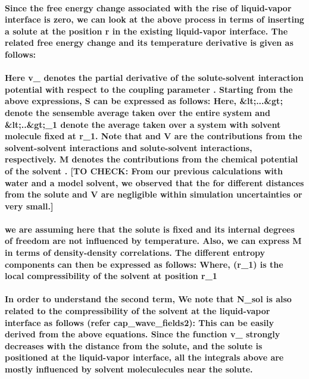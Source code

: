 \documentclass[a4paper,12pt,single,pdftex]{scrartcl}
\begin{document}
{\label{ID_1074911865}\paragraph{Since the free energy change associated with the rise of liquid-vapor interface is zero, we can look at the above process in terms of inserting a solute at the position r in the existing liquid-vapor interface. The related free energy change and its temperature derivative is given as follows:}

\label{ID_388366021}\paragraph{Here v_{\Psi} denotes the partial derivative of the solute-solvent interaction potential with respect to the coupling parameter \lambda. Starting from the above expressions, \delta S can be expressed as follows: Here, &lt;...&gt; denote the sensemble average taken over the entire system and &lt;..&gt;_1 denote the average taken over a system with solvent molecule fixed at r_1.  Note that \Phi and V are the contributions from the solvent-solvent interactions and solute-solvent interactions, respectively. M denotes the contributions from the chemical potential of the solvent . [TO CHECK: From our previous calculations with water and a model solvent, we observed that the for different distances from the solute \Phi and V are negligible within simulation uncertainties or very small.]}

\label{ID_349834534}\paragraph{we are assuming here that the solute is fixed and its internal degrees of freedom are not influenced by temperature. Also, we can express M in terms of density-density correlations. The different entropy components can then be expressed as follows: Where, \chi (r_1) is the local compressibility of the solvent at position r_1}

\label{ID_1103070320}\paragraph{In order to understand the second term, We note that \Delta N_{sol} is also related to the compressibility of the solvent at the liquid-vapor interface as follows (refer cap_wave_fields2):  This can be easily derived from the above equations. Since the function v_{\Psi} strongly decreases with the distance from the solute, and the solute is positioned at the liquid-vapor interface, all the integrals above are mostly influenced by solvent moleculecules near the solute.}

}
\end{document}
